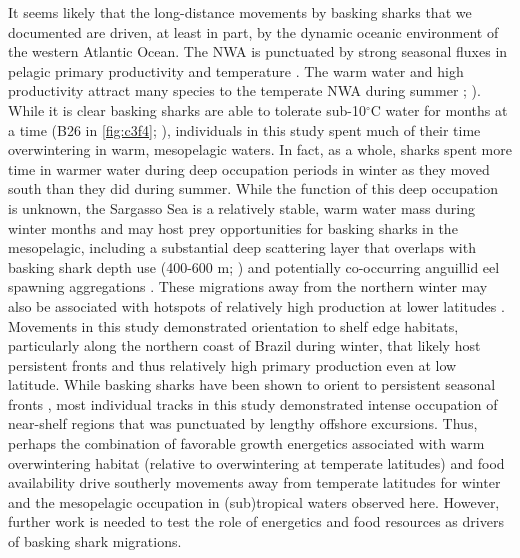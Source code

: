 It seems likely that the long-distance movements by basking sharks that we documented are driven, at least in part, by the dynamic oceanic environment of the western Atlantic Ocean. The NWA is punctuated by strong seasonal fluxes in pelagic primary productivity \citep{Miller2012} and temperature \citep{Talley2011}. The warm water and high productivity attract many species to the temperate NWA during summer \citealt[(e.g. basking sharks, ][]{Curtis2014}; \citealt[white sharks, ][]{Skomal2017a}). While it is clear basking sharks are able to tolerate sub-10$^{\circ}$C water for months at a time (B26 in \cref{fig:c3f4}; \citealt{Sims2008}), individuals in this study spent much of their time overwintering in warm, mesopelagic waters. In fact, as a whole, sharks spent more time in warmer water during deep occupation periods in winter as they moved south than they did during summer. While the function of this deep occupation is unknown, the Sargasso Sea is a relatively stable, warm water mass during winter months and may host prey opportunities for basking sharks in the mesopelagic, including a substantial deep scattering layer that overlaps with basking shark depth use (400-600 m; \citealt{Irigoien2014}) and potentially co-occurring anguillid eel spawning aggregations \citep{Wysujack2015}. These migrations away from the northern winter may also be associated with hotspots of relatively high production at lower latitudes \citep[(e.g. Brazilian shelf; ][]{Mourato2014}. Movements in this study demonstrated orientation to shelf edge habitats, particularly along the northern coast of Brazil during winter, that likely host persistent fronts \citep{LeFevre1987,Sims2008} and thus relatively high primary production even at low latitude. While basking sharks have been shown to orient to persistent seasonal fronts \citep{Miller2015}, most individual tracks in this study demonstrated intense occupation of near-shelf regions that was punctuated by lengthy offshore excursions. Thus, perhaps the combination of favorable growth energetics associated with warm overwintering habitat (relative to overwintering at temperate latitudes) and food availability drive southerly movements away from temperate latitudes for winter and the mesopelagic occupation in (sub)tropical waters observed here. However, further work is needed to test the role of energetics and food resources as drivers of basking shark migrations.

